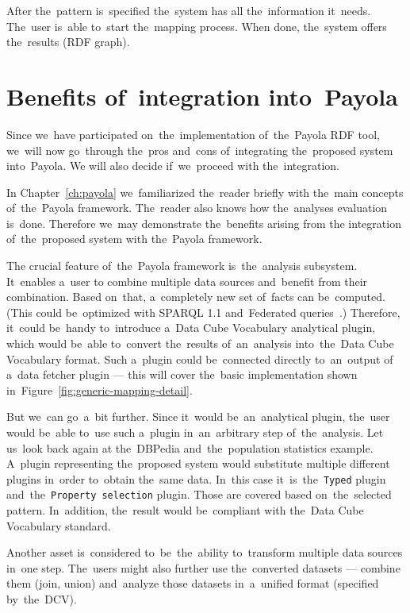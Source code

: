 After the~pattern is~specified the~system has all the~information it~needs. The~user is~able to~start the~mapping process. When done, the~system offers
the~results (RDF graph).
\FloatBarrier

\section{Benefits of~integration into~Payola}
\label{why-payola}
Since we~have participated on~the~implementation of~the~Payola RDF tool, we~will 
now go~through the~pros and~cons of~integrating the~proposed system into~Payola.
We will also decide if~we~proceed with the~integration.

\begin{sloppypar}
In Chapter~\ref{ch:payola} we~familiarized the~reader briefly with the~main
concepts of~the~Payola framework. The~reader also knows how the~analyses
evaluation is~done. Therefore we~may demonstrate the~benefits arising from
the integration of~the~proposed system with the~Payola framework.
\end{sloppypar}

The crucial feature of~the~Payola framework is~the~analysis subsystem. It~enables a~user
to combine multiple data sources and~benefit from their 
combination. Based on~that, a~completely new set of~facts can be~computed.
(This could be~optimized with SPARQL 1.1 and~Federated queries~\cite{federated-queries}.) 
Therefore, it~could be~handy to~introduce a~Data Cube Vocabulary analytical 
plugin, which would be~able to~convert the~results of~an~analysis into~the~Data 
Cube Vocabulary format. Such a~plugin could be~connected directly to~an~output
of a~data fetcher plugin --- this will cover the~basic implementation shown in~Figure~\ref{fig:generic-mapping-detail}.

But we~can go~a~bit further. Since it~would be~an~analytical plugin, the~user 
would be~able to~use such a~plugin in~an~arbitrary step of~the~analysis. Let us~look back again
at the~DBPedia and~the~population statistics example. A~plugin representing the~proposed
system would substitute multiple different plugins 
in~order to~obtain the~same data. In~this case it~is~the~\texttt{Typed}
plugin and~the~\texttt{Property selection} plugin. Those are covered based on~the~selected pattern.
In~addition, the~result would be~compliant with the~Data Cube Vocabulary standard.

Another asset is~considered to~be~the~ability to~transform multiple data 
sources in~one step. The~users might also further use the~converted datasets --- combine them
(join, union) and~analyze those datasets in~a~unified format (specified by~the~DCV).

